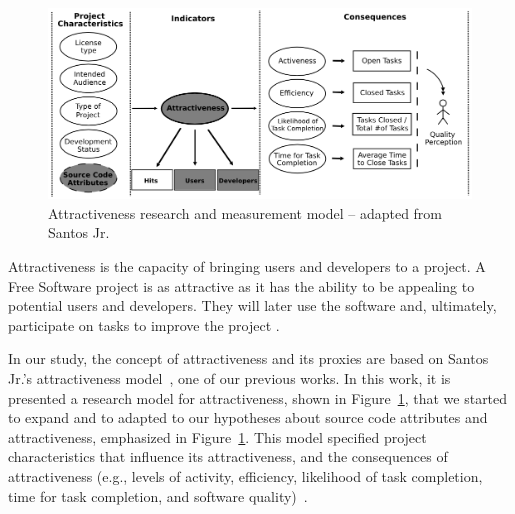 \documentclass[conference]{IEEEtran}
\begin{document}
\begin{figure}[!t]
\centering
\includegraphics[scale=.45]{figure/attractiveness3}
\caption{Attractiveness research and measurement model
-- adapted from Santos Jr.~\cite{Santos2010}}
\label{attractiveness}
\end{figure}

Attractiveness is the capacity of bringing users and developers to a project.
%
A Free Software project is as attractive as it has the ability to be appealing to 
potential users and developers. They will later use the software and, ultimately, 
participate on tasks to improve the project \cite{Santos2010}.

In our study, the concept of attractiveness and its proxies are
based on Santos Jr.'s attractiveness model~\cite{Santos2010},
one of our previous works.
%
In this work, it is presented a research model for attractiveness,
shown in Figure~\ref{attractiveness}, that we started to expand and 
to adapted to our hypotheses about source code attributes and attractiveness,
emphasized in Figure~\ref{attractiveness}.
%
This model specified project characteristics that influence 
its attractiveness, and the consequences of attractiveness (e.g., levels of activity, efficiency, 
likelihood of task completion, time for task completion, 
and software quality)~\cite{Santos2010}.
\end{document}
